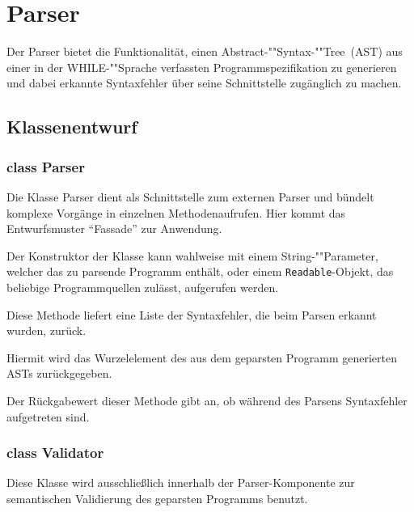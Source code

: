 \section{Parser}

Der Parser bietet die Funktionalität, einen Abstract-""Syntax-""Tree~(AST) aus einer in der WHILE-""Sprache verfassten Programmspezifikation zu generieren und dabei erkannte Syntaxfehler über seine Schnittstelle zugänglich zu machen.

\subsection{Klassenentwurf}

\subsubsection{class Parser}

Die Klasse Parser dient als Schnittstelle zum externen Parser und bündelt komplexe Vorgänge in einzelnen Methodenaufrufen. Hier kommt das Entwurfsmuster "`Fassade"' zur Anwendung.

\begin{description}
		Der Konstruktor der Klasse kann wahlweise mit einem String-""Parameter, welcher das zu parsende Programm enthält, oder einem \texttt{Readable}-Objekt, das beliebige Programmquellen zulässt, aufgerufen werden.

		Diese Methode liefert eine Liste der Syntaxfehler, die beim Parsen erkannt wurden, zurück.

		Hiermit wird das Wurzelelement des aus dem geparsten Programm generierten ASTs zurückgegeben.

		Der Rückgabewert dieser Methode gibt an, ob während des Parsens Syntaxfehler aufgetreten sind.
\end{description}

\subsubsection{class Validator}

Diese Klasse wird ausschließlich innerhalb der Parser-Komponente zur semantischen Validierung des geparsten Programms benutzt.

